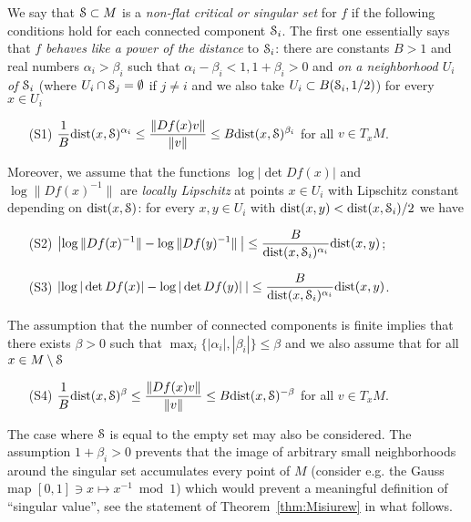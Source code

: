 \documentclass[reqno,12pt,a4paper]{amsart}
\theoremstyle{plain}
\theoremstyle{definition}
\begin{document}
 We say that \( {\EuScript{S}} \subset M\) is a {\em non-flat critical
   or singular set} for $f$ if the following conditions hold
 for each connected component ${\EuScript{S}}_i$. The first one
 essentially says that $f$ {\em behaves like a power of the
   distance} to \( {\EuScript{S}}_i \): there are constants $B>1$ and
 real numbers $\alpha_i>\beta_i$ such that
 $\alpha_i-\beta_i<1, 1+\beta_i>0$ and \emph{on a
   neighborhood $U_i$ of ${\EuScript{S}}_i$} (where
 $U_i\cap{\EuScript{S}}_j=\emptyset$ if $j\neq i$ and we also take
 $U_i\subset B({\EuScript{S}}_i,1/2)$) for every $x\in U_i$
\begin{enumerate}
 \item[(S1)]
   $\displaystyle{\frac{1}{B}{\operatorname{dist}}(x,{\EuScript{S}})^{\alpha_i}\leq
     \frac {\|Df(x)v\|}{\|v\|}\leq B{\operatorname{dist}}(x,{\EuScript{S}})^{\beta_i}}$
   for all $v\in T_x M$.
\end{enumerate}
Moreover, we assume that the functions \(  \log|\det Df(x)| \) and
\( \log \|Df(x)^{-1}\| \) are \emph{locally Lipschitz} at points
\( x\in U_i \) with Lipschitz constant
depending on ${\operatorname{dist}} (x, {\EuScript{S}})$: for every $x,y\in
U_i$ with ${\operatorname{dist}}(x,y)<{\operatorname{dist}}(x,{\EuScript{S}}_i)/2$ we have
\begin{enumerate}
\item[(S2)] $\displaystyle{\left|\log\|Df(x)^{-1}\|-
\log\|Df(y)^{-1}\|\:\right|\leq
\frac{B}{{\operatorname{dist}}(x,{\EuScript{S}}_i)^{\alpha_i}}{\operatorname{dist}}(x,y)}$;
\item[(S3)] $\displaystyle{\left|\log|\det Df(x)|- \log|\det
      Df(y)|\:\right|\leq
    \frac{B}{{\operatorname{dist}}(x,{\EuScript{S}}_i)^{\alpha_i}}{\operatorname{dist}}(x,y)}$.
 \end{enumerate}
 The assumption that the number of connected components is
 finite implies that there exists $\beta>0$ such that
 $\max_i\{|\alpha_i|,|\beta_i|\}\le\beta$ and we also assume
 that for all $x\in M\setminus{\EuScript{S}}$
 \begin{itemize}
 \item[(S4)] $\displaystyle{\frac{1}{B}{\operatorname{dist}}(x,{\EuScript{S}})^{\beta}\leq
     \frac {\|Df(x)v\|}{\|v\|}\leq B{\operatorname{dist}}(x,{\EuScript{S}})^{-\beta}}$
   for all $v\in T_x M$.
 \end{itemize}
 The case where ${\EuScript{S}}$ is equal to the empty set may also be
 considered. The assumption $1+\beta_i>0$ prevents that the
 image of arbitrary small neighborhoods around the singular
 set accumulates every point of $M$ (consider e.g. the Gauss
 map $[0,1]\ni x\mapsto x^{-1}\bmod1$) which would prevent a
 meaningful definition of ``singular value'', see the
 statement of Theorem~\ref{thm:Misiurew} in what follows.
\end{document}
